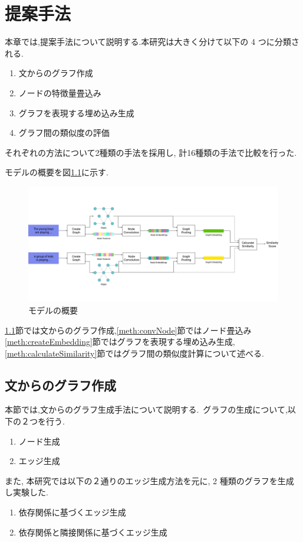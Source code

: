\documentclass[a4j,twoside,12pt, dvipdfmx]{thesis} %
\begin{document}
\addtocounter{chapter}{+2}

\setlength{\baselineskip}{1.95zw}
\setlength{\textheight}{30\baselineskip}
\mainmatter

\fi
%
\renewcommand\thefootnote{\arabic{footnote})}
\def\vector#1{\mbox{\boldmath $#1$}}

\chapter{提案手法}\label{meth}
本章では,提案手法について説明する.本研究は大きく分けて以下の 4 つに分類される.
\begin{enumerate}
  \item 文からのグラフ作成
  \item ノードの特徴量畳込み
  \item グラフを表現する埋め込み生成
  \item グラフ間の類似度の評価
\end{enumerate}
それぞれの方法について2種類の手法を採用し, 計16種類の手法で比較を行った. \par
モデルの概要を図\ref{fig:ModelFlow}に示す.
\begin{figure}
  \centering
  \includegraphics[width=\linewidth]
  {img/ModelFlow.jpg}
  \caption{モデルの概要}
  \label{fig:ModelFlow}
\end{figure}

\ref{meth:createGraph}節では文からのグラフ作成,\ref{meth:convNode}節ではノード畳込み \ref{meth:createEmbedding}節ではグラフを表現する埋め込み生成, \ref{meth:calculateSimilarity}節ではグラフ間の類似度計算について述べる.

\section{文からのグラフ作成}\label{meth:createGraph}
本節では,文からのグラフ生成手法について説明する.\
グラフの生成について,以下の２つを行う.
\begin{enumerate}
  \item ノード生成
  \item エッジ生成
\end{enumerate}
また, 本研究では以下の２通りのエッジ生成方法を元に, 2 種類のグラフを生成し実験した.
\begin{enumerate}
  \item 依存関係に基づくエッジ生成
  \item 依存関係と隣接関係に基づくエッジ生成
\end{enumerate}
\end{document}
